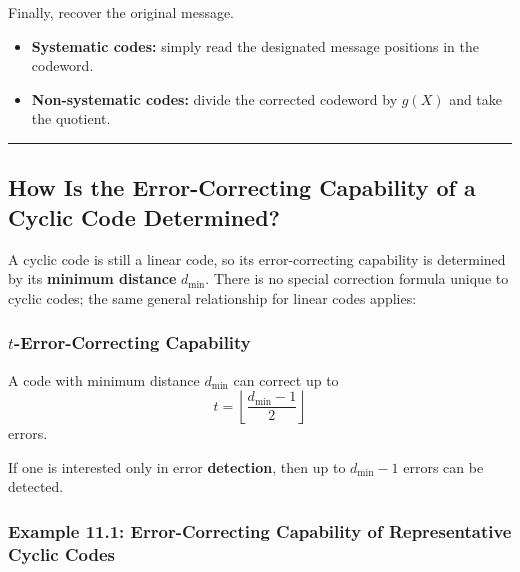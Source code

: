 \documentclass[
]{article}
\providecommand{\tightlist}{%
  \setlength{\itemsep}{0pt}\setlength{\parskip}{0pt}}
\begin{document}
Finally, recover the original message.

\begin{itemize}
\tightlist
\item
  \textbf{Systematic codes:} simply read the designated message
  positions in the codeword.
\item
  \textbf{Non-systematic codes:} divide the corrected codeword by
  \(g(X)\) and take the quotient.
\end{itemize}

\begin{center}\rule{0.5\linewidth}{0.5pt}\end{center}

\subsection{How Is the Error-Correcting Capability of a Cyclic Code
Determined?}\label{how-is-the-error-correcting-capability-of-a-cyclic-code-determined}

A cyclic code is still a linear code, so its error-correcting capability
is determined by its \textbf{minimum distance} \(d_{\min}\). There is no
special correction formula unique to cyclic codes; the same general
relationship for linear codes applies:

\subsubsection{\texorpdfstring{\(t\)-Error-Correcting
Capability}{t-Error-Correcting Capability}}\label{core-result-t-error-correcting-capability}

A code with minimum distance \(d_{\min}\) can correct up to
\[t = \left\lfloor \frac{d_{\min}-1}{2} \right\rfloor\] errors.

If one is interested only in error \textbf{detection}, then up to
\(d_{\min}-1\) errors can be detected.

\subsubsection{Example 11.1: Error-Correcting Capability of
Representative Cyclic
Codes}\label{example-11.1-error-correcting-capability-of-representative-cyclic-codes}
\end{document}
